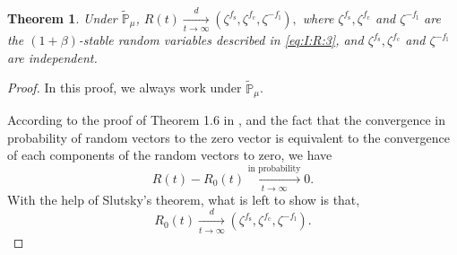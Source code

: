 \documentclass[12pt,a4paper]{amsart}
\theoremstyle{plain}
\newtheorem{thm}{Theorem}[section]
\theoremstyle{definition}
\numberwithin{equation}{section}
\begin{document}
\begin{thm}\label{thm: II}
Under $\mathbb{\widetilde{P}}_{\mu}$,
$
R(t) \xrightarrow[t\rightarrow\infty]{d}(\zeta^{f_\mathrm s},\zeta^{f_\mathrm c},\zeta^{-f_\mathrm l}),
$
where $\zeta^{f_\mathrm s},\zeta^{f_\mathrm c}$ and $\zeta^{-f_\mathrm l}$ are
the $(1+\beta)$-stable random variables described in \eqref{eq:I:R:3}, and $\zeta^{f_\mathrm s},\zeta^{f_\mathrm c}$ and $\zeta^{-f_\mathrm l}$ are independent.
\end{thm}
\begin{proof}
In this proof, we always work under $\mathbb{\widetilde{P}}_{\mu}$.
\begin{comment}
	Note that for each $t\geq 1$,
\[
	R(t)
	= R_0(t) + \big( R_1(t)-R_0(t) \big) + R_2(t) + R_3(t).
\]
	Note that
\[
	(R_1(t)-R_0(t))
	=(I_1^{f_\mathrm s}(t)-I_0^{f_\mathrm s}(t), I_1^{f_\mathrm c}(t)-I_0^{f_\mathrm c}(t), I_1^{f_\mathrm l}(t)-I_0^{f_\mathrm l}(t)).
\]
	In the proof of Theorem 1.6(1) in \cite{RenSongSunZhao2019Stable}, we proved that $I_1^{f_\mathrm s}(t)-I_0^{f_\mathrm s}(t)\xrightarrow[t\to \infty]{d} 0$, $I_2^{f_\mathrm s}(t)\xrightarrow[t\to \infty]{d} 0$ and $I_3^{f_\mathrm s}(t)\xrightarrow[t\to \infty]{\mathbb{\widetilde{P}}_{\mu}-a.s.} 0.$
	In the proof of Theorem 1.6(2) in \cite{RenSongSunZhao2019Stable}, we proved that $I_1^{f_\mathrm c}(t)-I_0^{f_\mathrm c}(t)\xrightarrow[t\to \infty]{d} 0$, $I_2^{f_\mathrm c}(t)\xrightarrow[t\to \infty]{d} 0$ and $I_3^{f_\mathrm c}(t)\xrightarrow[t\to \infty]{\mathbb{\widetilde{P}}_{\mu}-a.s.} 0.$
	In the proof of Theorem 1.6(3) in \cite{RenSongSunZhao2019Stable}, we proved that $I_1^{f_\mathrm l}(t)-I_0^{f_\mathrm l}(t)\xrightarrow[t\to \infty]{d} 0$ and  $I_2^{f_\mathrm l}(t)\xrightarrow[t\to \infty]{d} 0$.
	Thus we have $R_1(t)-R_0(t)\xrightarrow[t\to \infty]{d} (0,0,0)$, $R_2(t)\xrightarrow[t\to \infty]{d}(0,0,0)$ and $R_3(t)\xrightarrow[t\to \infty]{d}(0,0,0)$.
	Combining the above results and using Slutsky's theorem, we only need to  show that, under $\mathbb{\widetilde{P}}_{\mu}$,
\begin{equation} \label{lem:UOT}
	R_0(t) 
	\xrightarrow[t\to \infty]{d}(\zeta^{f_\mathrm s},\zeta^{f_\mathrm c},\zeta^{-f_\mathrm l}).
\end{equation}
\end{comment}
	According to the proof of Theorem 1.6 in \cite{RenSongSunZhao2019Stable}, and the fact that the convergence in probability of random vectors to the zero vector is equivalent to the convergence of each components of the random vectors to zero, we have
\[
	R(t)-R_0(t) \xrightarrow[t\to \infty]{\text{in probability}} 0.
\]
	With the help of Slutsky's theorem, what is left to show is that,
\begin{equation} \label{lem:UOT}
	R_0(t) 
	\xrightarrow[t\to \infty]{d}(\zeta^{f_\mathrm s},\zeta^{f_\mathrm c},\zeta^{-f_\mathrm l}).
\end{equation}


\end{proof}
\end{document}
